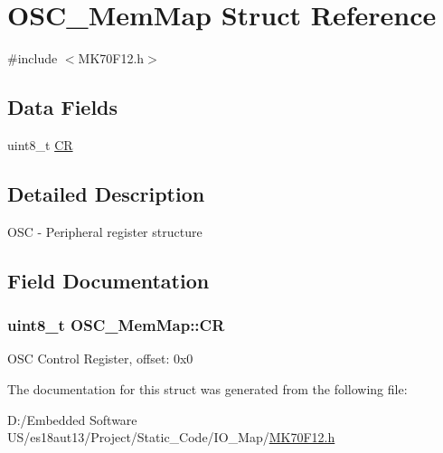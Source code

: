 \hypertarget{struct_o_s_c___mem_map}{}\section{O\+S\+C\+\_\+\+Mem\+Map Struct Reference}
\label{struct_o_s_c___mem_map}


{\ttfamily \#include $<$M\+K70\+F12.\+h$>$}

\subsection*{Data Fields}
\begin{DoxyCompactItemize}
\item 
uint8\+\_\+t \hyperlink{struct_o_s_c___mem_map_adb3c443099915a22c9951ff23c8eaa16}{C\+R}
\end{DoxyCompactItemize}


\subsection{Detailed Description}
O\+S\+C -\/ Peripheral register structure 

\subsection{Field Documentation}
\hypertarget{struct_o_s_c___mem_map_adb3c443099915a22c9951ff23c8eaa16}{}
\subsubsection[{C\+R}]{\setlength{\rightskip}{0pt plus 5cm}uint8\+\_\+t O\+S\+C\+\_\+\+Mem\+Map\+::\+C\+R}\label{struct_o_s_c___mem_map_adb3c443099915a22c9951ff23c8eaa16}
O\+S\+C Control Register, offset\+: 0x0 

The documentation for this struct was generated from the following file\+:\begin{DoxyCompactItemize}
\item 
D\+:/\+Embedded Software U\+S/es18aut13/\+Project/\+Static\+\_\+\+Code/\+I\+O\+\_\+\+Map/\hyperlink{_m_k70_f12_8h}{M\+K70\+F12.\+h}\end{DoxyCompactItemize}
